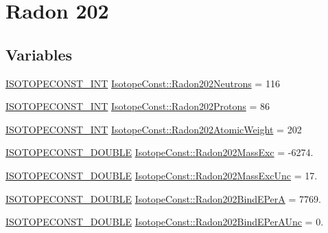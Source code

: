 \hypertarget{group___isotope_const-_radon-_rn202}{}\section{Radon 202}
\label{group___isotope_const-_radon-_rn202}
\subsection*{Variables}
\begin{DoxyCompactItemize}
\item 
\mbox{\hyperlink{group___isotope_const-_macros_ga5f18360b3e99483a35c32d789e62621c}{I\+S\+O\+T\+O\+P\+E\+C\+O\+N\+S\+T\+\_\+\+I\+NT}} \mbox{\hyperlink{group___isotope_const-_radon-_rn202_gad10f55bd4344feee35dd901b156d3aeb}{Isotope\+Const\+::\+Radon202\+Neutrons}} = 116
\item 
\mbox{\hyperlink{group___isotope_const-_macros_ga5f18360b3e99483a35c32d789e62621c}{I\+S\+O\+T\+O\+P\+E\+C\+O\+N\+S\+T\+\_\+\+I\+NT}} \mbox{\hyperlink{group___isotope_const-_radon-_rn202_gab3a114bab5e88106f3196bbb3f1d70f9}{Isotope\+Const\+::\+Radon202\+Protons}} = 86
\item 
\mbox{\hyperlink{group___isotope_const-_macros_ga5f18360b3e99483a35c32d789e62621c}{I\+S\+O\+T\+O\+P\+E\+C\+O\+N\+S\+T\+\_\+\+I\+NT}} \mbox{\hyperlink{group___isotope_const-_radon-_rn202_ga5f464592cc5a4fc36885c0a6f62410df}{Isotope\+Const\+::\+Radon202\+Atomic\+Weight}} = 202
\item 
\mbox{\hyperlink{group___isotope_const-_macros_ga8f45a7272ce02c0b4c65c44636ed719a}{I\+S\+O\+T\+O\+P\+E\+C\+O\+N\+S\+T\+\_\+\+D\+O\+U\+B\+LE}} \mbox{\hyperlink{group___isotope_const-_radon-_rn202_ga9697b619aef66be2f8c222b919bd3a14}{Isotope\+Const\+::\+Radon202\+Mass\+Exc}} = -\/6274.
\item 
\mbox{\hyperlink{group___isotope_const-_macros_ga8f45a7272ce02c0b4c65c44636ed719a}{I\+S\+O\+T\+O\+P\+E\+C\+O\+N\+S\+T\+\_\+\+D\+O\+U\+B\+LE}} \mbox{\hyperlink{group___isotope_const-_radon-_rn202_ga31b2f8f31e3a58f99af1617bf737bda0}{Isotope\+Const\+::\+Radon202\+Mass\+Exc\+Unc}} = 17.
\item 
\mbox{\hyperlink{group___isotope_const-_macros_ga8f45a7272ce02c0b4c65c44636ed719a}{I\+S\+O\+T\+O\+P\+E\+C\+O\+N\+S\+T\+\_\+\+D\+O\+U\+B\+LE}} \mbox{\hyperlink{group___isotope_const-_radon-_rn202_ga799af607e335b08adb11b726492d4a4d}{Isotope\+Const\+::\+Radon202\+Bind\+E\+PerA}} = 7769.
\item 
\mbox{\hyperlink{group___isotope_const-_macros_ga8f45a7272ce02c0b4c65c44636ed719a}{I\+S\+O\+T\+O\+P\+E\+C\+O\+N\+S\+T\+\_\+\+D\+O\+U\+B\+LE}} \mbox{\hyperlink{group___isotope_const-_radon-_rn202_ga1a54f80a4fa1d668677272e8c03c4aa1}{Isotope\+Const\+::\+Radon202\+Bind\+E\+Per\+A\+Unc}} = 0.

\end{DoxyCompactItemize}
